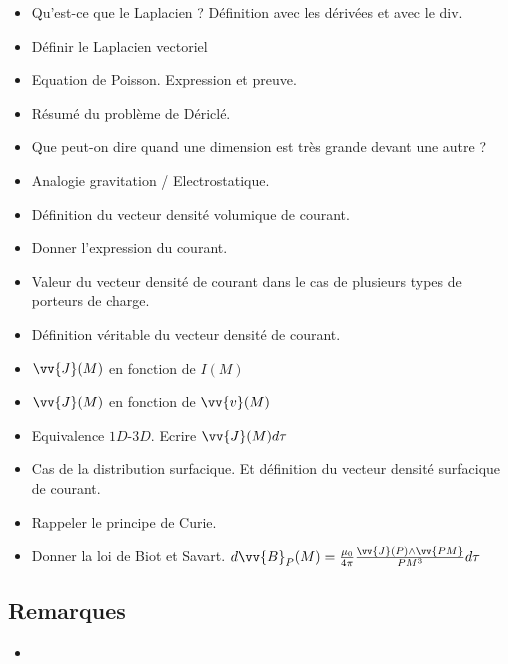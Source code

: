 \documentclass[a4paper, 11pt, hidelinks]{article}
\begin{document}
\begin{itemize}
    \item Qu'est-ce que le Laplacien ? Définition avec les dérivées et avec le div. \cite{Chapitre10}
    \item Définir le Laplacien vectoriel \cite{Chapitre10}
    \item Equation de Poisson. Expression et preuve. \cite{Chapitre10}
    \item Résumé du problème de Dériclé. \cite{Chapitre10}
    \item Que peut-on dire quand une dimension est très grande devant une autre ? \cite{Chapitre10}
    \item Analogie gravitation / Electrostatique. \cite{Chapitre10}
    \item Définition du vecteur densité volumique de courant. \cite{Chapitre11}
    \item Donner l'expression du courant. \cite{Chapitre11}
    \item Valeur du vecteur densité de courant dans le cas de plusieurs types de porteurs de charge. \cite{Chapitre11}
    \item Définition véritable du vecteur densité de courant. \cite{Chapitre11}
    \item $\vv{J}(M)$ en fonction de $I(M)$ \cite{Chapitre11}
    \item $\vv{J}(M)$ en fonction de $\vv{v}(M)$ \cite{Chapitre11}
    \item Equivalence $1D$-$3D$. Ecrire $\vv{J}(M) d \tau$ \cite{Chapitre11}
    \item Cas de la distribution surfacique. Et définition du vecteur densité surfacique de courant. \cite{Chapitre11}
    \item Rappeler le principe de Curie. \cite{Chapitre11}
    \item Donner la loi de Biot et Savart. $d\vv{B}_P(M)=\frac{\mu_0}{4 \pi}\frac{\vv{J}(P)\land \vv{PM}}{PM^3}d\tau$ \cite{Chapitre11}
\end{itemize}




\subsection{Remarques}


\begin{itemize}
    \item 
\end{itemize}
\end{document}
